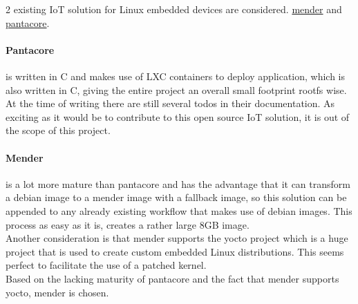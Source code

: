 \documentclass[../../main.tex]{subfiles}
\begin{document}
2 existing IoT solution for Linux embedded devices are considered.
\href{mender.io}{mender} and \href{pantahub.com}{pantacore}.\\

\paragraph{Pantacore}%
\label{par:pantacore}

is written in C and makes use of LXC containers to deploy application, which is also written in C,
giving the entire project an overall small footprint rootfs wise.\\
At the time of writing there are still several todos in their documentation. As exciting as it
would be to contribute to this open source IoT solution, it is out of the scope of this project.


\paragraph{Mender}%
\label{par:mender}

is a lot more mature than pantacore and has the advantage that it can transform a debian image
to a mender image with a fallback image, so this solution can be appended to any already 
existing workflow that makes use of debian images. This process as easy as it is, creates a
rather large 8GB image.\\

Another consideration is that mender supports the yocto project which is a huge project that is
used to create custom embedded Linux distributions. This seems perfect to facilitate the use of
a patched kernel.\\

Based on the lacking maturity of pantacore and the fact that mender supports yocto, mender is
chosen.
\end{document}

